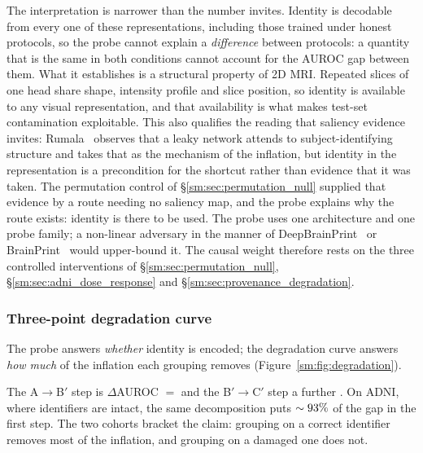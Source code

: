 \documentclass[11pt]{article}
\begin{document}
The interpretation is narrower than the number invites. Identity is
decodable from every one of these representations, including those
trained under honest protocols, so the probe cannot explain a
\emph{difference} between protocols: a quantity that is the same in
both conditions cannot account for the AUROC gap between them. What it
establishes is a structural property of 2D MRI. Repeated slices of one
head share shape, intensity profile and slice position, so identity is
available to any visual representation, and that availability is what
makes test-set contamination exploitable. This also qualifies the
reading that saliency evidence invites: Rumala~\cite{rumala2023}
observes that a leaky network attends to subject-identifying structure
and takes that as the mechanism of the inflation, but identity in the
representation is a precondition for the shortcut rather than evidence
that it was taken. The permutation control of
\S\ref{sm:sec:permutation_null} supplied that evidence by a route needing
no saliency map, and the probe explains why the route exists: identity
is there to be used. The probe uses one architecture and one probe
family; a non-linear adversary in the manner of
DeepBrainPrint~\cite{deepbrainprint2023} or
BrainPrint~\cite{wachinger2015brainprint} would upper-bound it. The
causal weight therefore rests on the three controlled interventions of
\S\ref{sm:sec:permutation_null}, \S\ref{sm:sec:adni_dose_response} and
\S\ref{sm:sec:provenance_degradation}.


\subsubsection{Three-point degradation curve}
\label{sm:sec:exp3_degrad}
The probe answers \emph{whether} identity is encoded; the degradation
curve answers \emph{how much} of the inflation each grouping removes
(Figure~\ref{sm:fig:degradation}).




The A$\to$B$'$ step is $\Delta$AUROC $=$ \TierOneGapFilename{} and
the B$'\to$C$'$ step a further \TierOneGapResidual{}. On ADNI, where
identifiers are intact, the same decomposition puts
$\sim 93\%$ of the
gap in the first step. The two cohorts bracket the claim: grouping on
a correct identifier removes most of the inflation, and grouping on a
damaged one does not.
\end{document}
